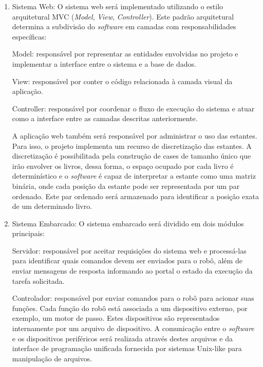 \begin{enumerate}
    \item Sistema Web: O sistema web será implementado utilizando o estilo arquitetural MVC (\textit{Model}, \textit{View}, \textit{Controller}). Este padrão arquitetural determina a subdivisão do \textit{software} em camadas com responsabilidades específicas:

    \subitem Model: responsável por representar as entidades envolvidas no projeto e implementar a interface entre o sistema e a base de dados.

    \subitem View: responsável por conter o código relacionada à camada visual da aplicação.

    \subitem Controller: responsável por coordenar o fluxo de execução do sistema e atuar como a interface entre as camadas descritas anteriormente.
    
    A aplicação web também será responsável por administrar o uso das estantes. Para isso, o projeto implementa um recurso de discretização das estantes. A discretização é possibilitada pela construção de cases de tamanho único que irão envolver os livros, dessa forma, o espaço ocupado por cada livro é determinístico e o \textit{software} é capaz de interpretar a estante como uma matriz binária, onde cada posição da estante pode ser representada por um par ordenado. Este par ordenado será armazenado para identificar a posição exata de um determinado livro.


    \item Sistema Embarcado: O sistema embarcado será dividido em dois módulos principais:

    \subitem Servidor: responsável por aceitar requisições do sistema web e processá-las para identificar quais comandos devem ser enviados para o robô, além de enviar mensagens de resposta informando ao portal o estado da execução da tarefa solicitada.

    \subitem Controlador: responsável por enviar comandos para o robô para acionar suas funções. Cada função do robô está associada a um dispositivo externo, por exemplo, um motor de passo. Estes dispositivos são representados internamente por um arquivo de dispositivo. A comunicação entre o \textit{software} e os dispositivos periféricos será realizada através destes arquivos e da interface de programação unificada fornecida por sistemas Unix-like para manipulação de arquivos.
    
\end{enumerate}



